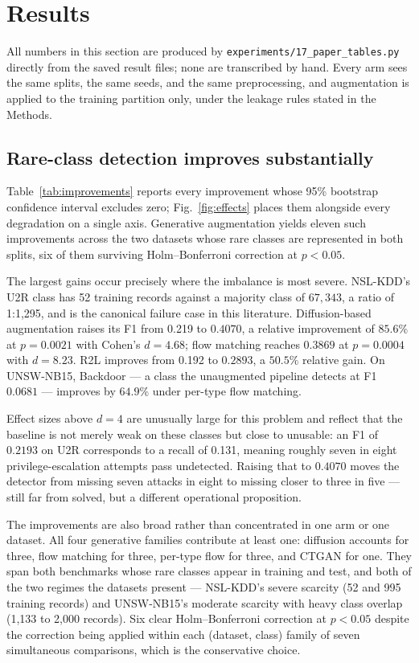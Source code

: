 \documentclass[11pt]{article}
\newcommand{\baseUtwrRec}{0.131}      %
\newcommand{\baseRtwolFone}{0.192}    %
\newcommand{\baseUtwrFone}{0.219}     %
\newcommand{\utwrTrain}{52}
\newcommand{\utwrRatio}{1{:}1{,}295}
\begin{document}
\section*{Results}


All numbers in this section are produced by \texttt{experiments/17\_paper\_tables.py}
directly from the saved result files; none are transcribed by hand. Every arm sees
the same splits, the same seeds, and the same preprocessing, and augmentation is
applied to the training partition only, under the leakage rules stated in the Methods.

\subsection*{Rare-class detection improves substantially}

Table~\ref{tab:improvements} reports every improvement whose 95\% bootstrap
confidence interval excludes zero; Fig.~\ref{fig:effects} places them alongside
every degradation on a single axis. Generative augmentation yields eleven such
improvements across the two datasets whose rare classes are represented in both
splits, six of them surviving Holm--Bonferroni correction at $p<0.05$.

The largest gains occur precisely where the imbalance is most severe. NSL-KDD's U2R
class has \utwrTrain{} training records against a majority class of
$67{,}343$, a ratio of \utwrRatio{}, and is the canonical failure case in this
literature. Diffusion-based augmentation raises its F1 from \baseUtwrFone{} to
$0.4070$, a relative improvement of $85.6\%$ at $p=0.0021$ with Cohen's $d=4.68$;
flow matching reaches $0.3869$ at $p=0.0004$ with $d=8.23$. R2L improves from
\baseRtwolFone{} to $0.2893$, a $50.5\%$ relative gain. On UNSW-NB15, Backdoor --- a
class the unaugmented pipeline detects at F1 $0.0681$ --- improves by $64.9\%$ under
per-type flow matching.

Effect sizes above $d=4$ are unusually large for this problem and reflect that the
baseline is not merely weak on these classes but close to unusable: an F1 of
$0.2193$ on U2R corresponds to a recall of \baseUtwrRec{}, meaning roughly seven in
eight privilege-escalation attempts pass undetected. Raising that to $0.4070$ moves
the detector from missing seven attacks in eight to missing closer to three in five
--- still far from solved, but a different operational proposition.

The improvements are also broad rather than concentrated in one arm or one dataset.
All four generative families contribute at least one: diffusion accounts for three,
flow matching for three, per-type flow for three, and CTGAN for one. They span both
benchmarks whose rare classes appear in training and test, and both of the two
regimes the datasets present --- NSL-KDD's severe scarcity (52 and 995 training
records) and UNSW-NB15's moderate scarcity with heavy class overlap (1,133 to 2,000
records). Six clear Holm--Bonferroni correction at $p<0.05$ despite the correction
being applied within each (dataset, class) family of seven simultaneous comparisons,
which is the conservative choice.
\end{document}
